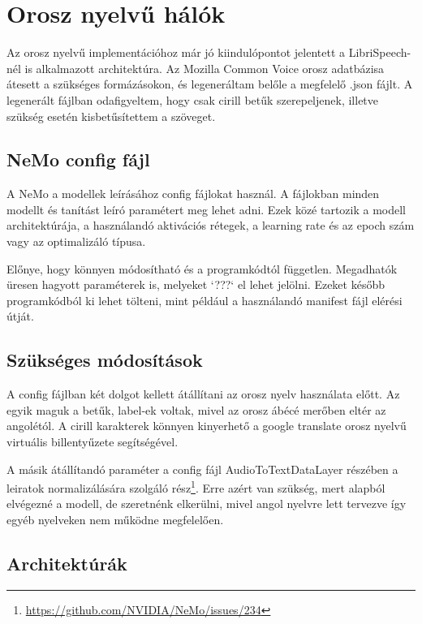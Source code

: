 \section{Orosz nyelvű hálók}

Az orosz nyelvű implementációhoz már jó kiindulópontot jelentett a LibriSpeech-nél is alkalmazott architektúra. Az Mozilla Common Voice orosz adatbázisa átesett a szükséges formázásokon, és legeneráltam belőle a megfelelő .json fájlt. A legenerált fájlban odafigyeltem, hogy csak cirill betűk szerepeljenek, illetve szükség esetén kisbetűsítettem a szöveget.

\subsection{NeMo config fájl}

A NeMo a modellek leírásához config fájlokat használ. A fájlokban minden modellt és tanítást leíró paramétert meg lehet adni. Ezek közé tartozik a modell architektúrája, a használandó aktivációs rétegek, a learning rate és az epoch szám vagy az optimalizáló típusa.

Előnye, hogy könnyen módosítható és a programkódtól független. Megadhatók üresen hagyott paraméterek is, melyeket `???` el lehet jelölni. Ezeket később programkódból ki lehet tölteni, mint például a használandó manifest fájl elérési útját.

\subsection{Szükséges módosítások}

A config fájlban két dolgot kellett átállítani az orosz nyelv használata előtt. Az egyik maguk a betűk, label-ek voltak, mivel az orosz ábécé merőben eltér az angolétól. A cirill karakterek könnyen kinyerhető a google translate orosz nyelvű virtuális billentyűzete segítségével.

A másik átállítandó paraméter a config fájl AudioToTextDataLayer részében a leiratok normalizálására szolgáló rész\footnote{\url{https://github.com/NVIDIA/NeMo/issues/234}}. Erre azért van szükség, mert alapból elvégezné a modell, de szeretnénk elkerülni, mivel angol nyelvre lett tervezve így egyéb nyelveken nem működne megfelelően.

\subsection{Architektúrák}

